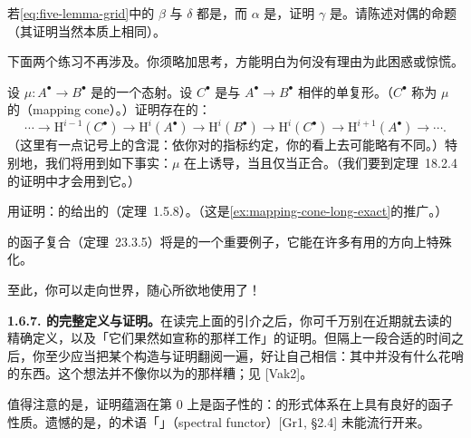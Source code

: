 \begin{exercise}[五引理的另一个微妙版本]\label{ex:five-lemma-partial-iso}
若\eqref{eq:five-lemma-grid}中的 $\beta$ 与 $\delta$ 都是\trInjectiveMap，而 $\alpha$ 是\trSurjectiveMap，证明 $\gamma$ 是\trInjectiveMap。请陈述对偶的命题（其证明当然本质上相同）。
\end{exercise}

下面两个练习不再涉及\trFirstQuadrant\trDoubleComplex。你须略加思考，方能明白为何没有理由为此困惑或惊慌。

\begin{exercise}\label{ex:mapping-cone-long-exact}
设 $\mu\colon A^{\bullet}\to B^{\bullet}$ 是\trComplexes{}的一个态射。设 $C^{\bullet}$ 是与\trDoubleComplex{} $A^{\bullet}\to B^{\bullet}$ 相伴的单复形。（$C^{\bullet}$ 称为 $\mu$ 的\textbf{\trMappingCone}（mapping cone）。）证明存在\trComplexes{}的\trLongExactSequence：
\[
\cdots\longrightarrow\mathrm{H}^{i-1}(C^{\bullet})\longrightarrow\mathrm{H}^{i}(A^{\bullet})\longrightarrow\mathrm{H}^{i}(B^{\bullet})\longrightarrow\mathrm{H}^{i}(C^{\bullet})\longrightarrow\mathrm{H}^{i+1}(A^{\bullet})\longrightarrow\cdots.
\]
（这里有一点记号上的含混：依你对\trDoubleComplex{}的指标约定，你的\trLongExactSequence{}看上去可能略有不同。）特别地，我们将用到如下事实：$\mu$ 在\trCohomology{}上诱导\trIsomorphism，当且仅当\trMappingCone{}正合。（我们要到定理~18.2.4 的证明中才会用到它。）
\end{exercise}

\begin{exercise}\label{ex:ses-cohomology-les}
用\trSpectralSequence{}证明：\trComplexes{}的\trShortExactSequence{}给出\trCohomology{}的\trLongExactSequence{}（定理~1.5.8）。（这是\cref{ex:mapping-cone-long-exact}的推广。）
\end{exercise}

\trGrothendieck{}的函子复合\trSpectralSequence{}（定理~23.3.5）将是\trSpectralSequence{}的一个重要例子，它能在许多有用的方向上特殊化。

至此，你可以走向世界，随心所欲地使用\trSpectralSequence{}了！

\textbf{1.6.7. \trSpectralSequence{}的完整定义与证明。}\quad 在读完上面的\trSpectralSequence{}引介之后，你可千万别在近期就去读\trSpectralSequence{}的精确定义，以及「它们果然如宣称的那样工作」的证明。但隔上一段合适的时间之后，你至少应当把某个构造与证明翻阅一遍，好让自己相信：其中并没有什么花哨的东西。这个想法并不像你以为的那样糟；见 [Vak2]。

值得注意的是，证明蕴涵\trSpectralSequence{}在第 $0$ \trPage{}上是函子性的：\trSpectralSequence{}的形式体系在\trDoubleComplex{}上具有良好的函子性质。遗憾的是，\trGrothendieck{}的术语「\trSpectralFunctor」（spectral functor）[Gr1, \S2.4] 未能流行开来。

